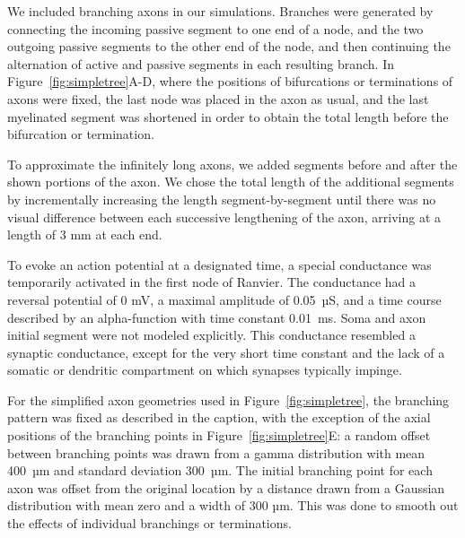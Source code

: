\documentclass[]{elife}
\begin{document}
We included branching axons in our simulations. Branches were generated
by connecting the incoming passive segment to one end of a node, and the
two outgoing passive segments to the other end of the node, and then
continuing the alternation of active and passive segments in each
resulting branch. In Figure~\ref{fig:simpletree}A-D, where the positions
of bifurcations or terminations of axons were fixed, the last node was
placed in the axon as usual, and the last myelinated segment was
shortened in order to obtain the total length before the bifurcation or
termination.

To approximate the infinitely long axons, we added segments before and
after the shown portions of the axon. We chose the total length of the
additional segments by incrementally increasing the length
segment-by-segment until there was no visual difference between each
successive lengthening of the axon, arriving at a length of 3 mm at each
end.

To evoke an action potential at a designated time, a special conductance
was temporarily activated in the first node of Ranvier. The conductance
had a reversal potential of 0 mV, a maximal amplitude of 0.05~µS, and a
time course described by an alpha-function with time constant 0.01~ms.
Soma and axon initial segment were not modeled explicitly. This
conductance resembled a synaptic conductance, except for the very short
time constant and the lack of a somatic or dendritic compartment on
which synapses typically impinge.

For the simplified axon geometries used in Figure~\ref{fig:simpletree},
the branching pattern was fixed as described in the caption, with the
exception of the axial positions of the branching points in
Figure~\ref{fig:simpletree}E: a random offset between branching points
was drawn from a gamma distribution with mean 400~µm and standard
deviation 300~µm. The initial branching point for each axon was offset
from the original location by a distance drawn from a Gaussian
distribution with mean zero and a width of 300 µm. This was done to
smooth out the effects of individual branchings or terminations.
\end{document}
